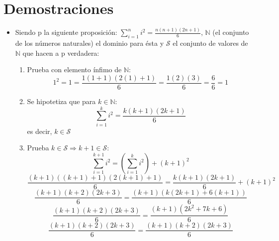 \documentclass[12pt,a4paper]{article}
\begin{document}
        \section{Demostraciones}
            \begin{itemize}
                \item Siendo p la siguiente proposición: $\sum_{i = 1}^{n} i^2 = \frac{n(n+1)(2n+1)}{6}$, $\mathbb{N}$ (el conjunto de los números naturales) el dominio para ésta y $\mathcal{S}$ el conjunto de valores de $\mathbb{N}$ que hacen a p verdadera:
                
                \begin{enumerate}
                    \item Prueba con elemento ínfimo de $\mathbb{N}$:\\
                    $$1^2 = 1 = \frac{1(1+1)(2(1)+1)}{6} = \frac{1(2)(3)}{6} = \frac{6}{6} = 1$$
                    \item Se hipotetiza que para
                    $k \in \mathbb{N}$:
                    $$\sum_{i = 1}^{k} i^2 = \frac{k(k+1)(2k+1)}{6}$$
                    es decir, $k \in \mathcal{S}$
                    \item Prueba $k \in \mathcal{S} \Rightarrow k+1 \in \mathcal{S}$:\\
             
                    $$\sum_{i = 1}^{k+1}i^2 = (\sum_{i = 1}^{k}i^2) + (k+1)^2$$
                    $$\frac{(k+1)((k+1)+1)(2(k+1)+1)}{6} = \frac{k(k+1)(2k+1)}{6} + (k+1)^2$$
                    $$\frac{(k+1)(k+2)(2k+3)}{6} = \frac{(k+1)(k(2k+1)+ 6(k+1))}{6}$$
                    $$\frac{(k+1)(k+2)(2k+3)}{6} = \frac{(k+1)(2k^2+7k+6)}{6}$$
                    $$\frac{(k+1)(k+2)(2k+3)}{6} = \frac{(k+1)(k+2)(2k+3)}{6}$$

                     
                \end{enumerate}
            \end{itemize}
\end{document}
